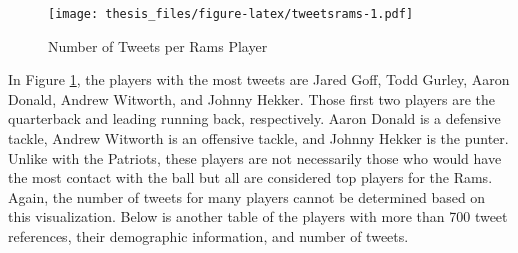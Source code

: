 \documentclass[12pt,twoside]{reedthesis}
\newenvironment{Shaded}{\begin{snugshade}}{\end{snugshade}}
\newcommand{\KeywordTok}[1]{\textcolor[rgb]{0.13,0.29,0.53}{\textbf{#1}}}
\newcommand{\DataTypeTok}[1]{\textcolor[rgb]{0.13,0.29,0.53}{#1}}
\newcommand{\DecValTok}[1]{\textcolor[rgb]{0.00,0.00,0.81}{#1}}
\newcommand{\StringTok}[1]{\textcolor[rgb]{0.31,0.60,0.02}{#1}}
\newcommand{\CommentTok}[1]{\textcolor[rgb]{0.56,0.35,0.01}{\textit{#1}}}
\newcommand{\OtherTok}[1]{\textcolor[rgb]{0.56,0.35,0.01}{#1}}
\newcommand{\OperatorTok}[1]{\textcolor[rgb]{0.81,0.36,0.00}{\textbf{#1}}}
\newcommand{\NormalTok}[1]{#1}
\begin{document}
\small
\begin{Shaded}
\end{Shaded}
\begin{figure}
\centering
\texttt{[image: thesis\_files/figure-latex/tweetsrams-1.pdf]}
\caption{\label{fig:tweetsrams}Number of Tweets per Rams Player}
\end{figure}
\normalsize
In Figure \ref{fig:tweetsrams}, the players with the most tweets are
Jared Goff, Todd Gurley, Aaron Donald, Andrew Witworth, and Johnny
Hekker. Those first two players are the quarterback and leading running
back, respectively. Aaron Donald is a defensive tackle, Andrew Witworth
is an offensive tackle, and Johnny Hekker is the punter. Unlike with the
Patriots, these players are not necessarily those who would have the
most contact with the ball but all are considered top players for the
Rams. Again, the number of tweets for many players cannot be determined
based on this visualization. Below is another table of the players with
more than 700 tweet references, their demographic information, and
number of tweets.
\end{document}
